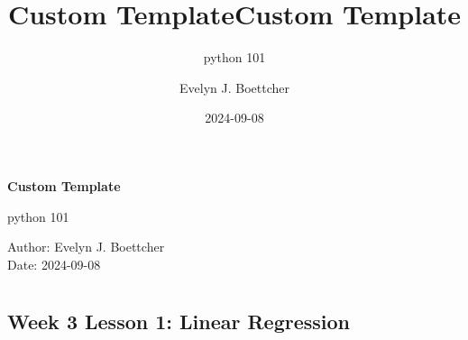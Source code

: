 \documentclass[
]{report}
\title{Custom Template}
\subtitle{python 101}
\author{Evelyn J. Boettcher}
\date{2024-09-08}
\renewcommand*\contentsname{Table of contents}
\newcommand\contentsname{Table of contents}
\begin{document}
 
  \begin{titlepage}
  
  \begin{titlepage}
  \thispagestyle{custom-fancy}
  \vspace{2cm}

  \begin{center}
    
    \Huge
    \textbf{Custom Template}
    \vspace{1cm}
   
    \huge
        python 101
      \vspace{1cm}
    \end{center}


  \vfill

  \Large
  Author: Evelyn J. Boettcher \\
  Date: 2024-09-08



  \end{titlepage}

  \title{Custom Template}  \end{titlepage}


\thispagestyle{plain} 

\ifdefined\Shaded\renewenvironment{Shaded}{\begin{tcolorbox}[boxrule=0pt, borderline west={3pt}{0pt}{shadecolor}, frame hidden, interior hidden, breakable, sharp corners, enhanced]}{\end{tcolorbox}}\fi

\renewcommand*\contentsname{Table of contents}
{
\hypersetup{linkcolor=}
\setcounter{tocdepth}{2}
\tableofcontents
}
\hypertarget{section}{%
\chapter{}\label{section}}

\hypertarget{week-3-lesson-1-linear-regression}{%
\section{Week 3 Lesson 1: Linear
Regression}\label{week-3-lesson-1-linear-regression}}
\end{document}
